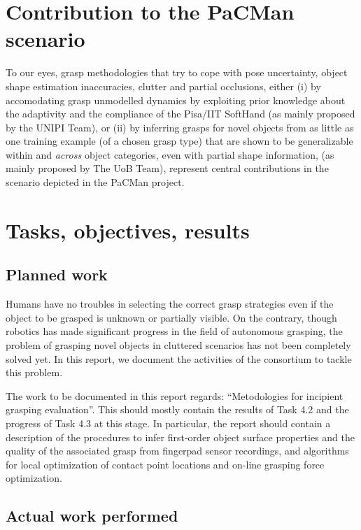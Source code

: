 \documentclass[a4paper,11pt,pdf]{pacmanreport}
\begin{document}
\section*{Contribution to the PaCMan scenario}

To our eyes, grasp methodologies that try to cope with pose uncertainty, object shape estimation inaccuracies, clutter and partial occlusions, either (i) by accomodating grasp unmodelled dynamics by exploiting prior knowledge about the adaptivity and the compliance of the Pisa/IIT SoftHand (as mainly proposed by the UNIPI Team), or (ii) by inferring grasps for novel objects from as little as one training example (of a chosen grasp type) that are shown to be generalizable within and \emph{across} object categories, even with partial shape information, (as mainly proposed by The UoB Team), represent central contributions in the scenario depicted in the PaCMan project.


\newpage

\section{Tasks, objectives, results}

\subsection{Planned work}

Humans have no troubles in selecting the correct grasp strategies even if the object to be grasped is unknown or partially visible. On the contrary, though robotics has made significant progress in the field of autonomous grasping, the problem of grasping novel objects in cluttered scenarios has not been completely solved yet. In this report, we document the activities of the consortium to tackle this problem.

The work to be documented in this report regards: ``Metodologies for incipient grasping evaluation''. This should mostly contain the results of Task 4.2 and the progress of Task 4.3 at this stage. In particular, the report should contain a description of the procedures to infer first-order object surface properties and the quality of the associated grasp from fingerpad sensor recordings, and algorithms for local optimization of contact point locations and on-line grasping force optimization.


\subsection{Actual work performed}
\end{document}
